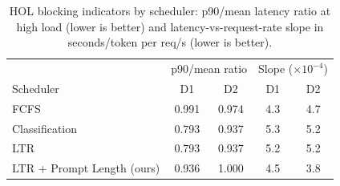 \begin{table}[t]
    \centering
    \caption{HOL blocking indicators by scheduler: p90/mean latency ratio at
    high load (lower is better) and latency-vs-request-rate slope in
    seconds/token per req/s (lower is better).}
    \label{tab:hol_blocking}
    \begin{tabular}{@{}lcccc@{}}
        \toprule
        & \multicolumn{2}{c}{p90/mean ratio} & \multicolumn{2}{c}{Slope ($\times 10^{-4}$)} \\
        Scheduler & D1 & D2 & D1 & D2 \\
        \midrule
        FCFS                        & 0.991 & 0.974 & 4.3 & 4.7 \\
        Classification              & 0.793 & 0.937 & 5.3 & 5.2 \\
        LTR                         & 0.793 & 0.937 & 5.2 & 5.2 \\
        LTR + Prompt Length (ours)  & 0.936 & 1.000 & 4.5 & 3.8 \\
        \bottomrule
    \end{tabular}
\end{table}
